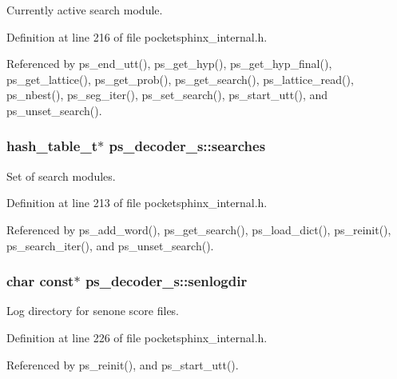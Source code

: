 Currently active search module. 



Definition at line 216 of file pocketsphinx\+\_\+internal.\+h.



Referenced by ps\+\_\+end\+\_\+utt(), ps\+\_\+get\+\_\+hyp(), ps\+\_\+get\+\_\+hyp\+\_\+final(), ps\+\_\+get\+\_\+lattice(), ps\+\_\+get\+\_\+prob(), ps\+\_\+get\+\_\+search(), ps\+\_\+lattice\+\_\+read(), ps\+\_\+nbest(), ps\+\_\+seg\+\_\+iter(), ps\+\_\+set\+\_\+search(), ps\+\_\+start\+\_\+utt(), and ps\+\_\+unset\+\_\+search().

\subsubsection[{searches}]{\setlength{\rightskip}{0pt plus 5cm}hash\+\_\+table\+\_\+t$\ast$ ps\+\_\+decoder\+\_\+s\+::searches}\label{structps__decoder__s_a43bca42790684eefb8d01a0aef6fa530}


Set of search modules. 



Definition at line 213 of file pocketsphinx\+\_\+internal.\+h.



Referenced by ps\+\_\+add\+\_\+word(), ps\+\_\+get\+\_\+search(), ps\+\_\+load\+\_\+dict(), ps\+\_\+reinit(), ps\+\_\+search\+\_\+iter(), and ps\+\_\+unset\+\_\+search().

\subsubsection[{senlogdir}]{\setlength{\rightskip}{0pt plus 5cm}char const$\ast$ ps\+\_\+decoder\+\_\+s\+::senlogdir}\label{structps__decoder__s_a0ed3476113fe3d63b13ac5e8da3f3b4f}


Log directory for senone score files. 



Definition at line 226 of file pocketsphinx\+\_\+internal.\+h.



Referenced by ps\+\_\+reinit(), and ps\+\_\+start\+\_\+utt().

